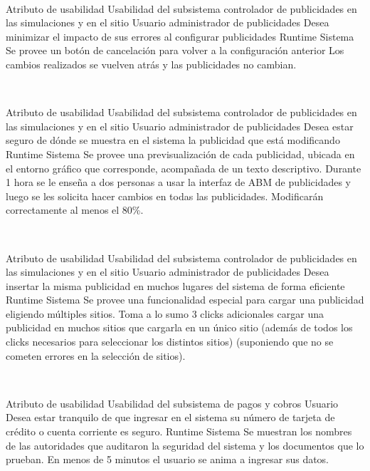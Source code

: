 ~

\escenario
{Atributo de usabilidad}
{Usabilidad del subsistema controlador de publicidades en las simulaciones y en el sitio}
{Usuario administrador de publicidades}
{Desea minimizar el impacto de sus errores al configurar publicidades}
{Runtime}
{Sistema}
{Se provee un botón de cancelación para volver a la configuración anterior}
{Los cambios realizados se vuelven atrás y las publicidades no cambian.}

~

\escenario
{Atributo de usabilidad}
{Usabilidad del subsistema controlador de publicidades en las simulaciones y en el sitio}
{Usuario administrador de publicidades}
{Desea estar seguro de dónde se muestra en el sistema la publicidad que está modificando}
{Runtime}
{Sistema}
{Se provee una previsualización de cada publicidad, ubicada en el entorno gráfico que corresponde, acompañada de un texto descriptivo.}
{Durante 1 hora se le enseña a dos personas a usar la interfaz de ABM de publicidades y luego se les solicita hacer cambios en todas las publicidades. Modificarán correctamente al menos el 80\%.}

~

\escenario
{Atributo de usabilidad}
{Usabilidad del subsistema controlador de publicidades en las simulaciones y en el sitio}
{Usuario administrador de publicidades}
{Desea insertar la misma publicidad en muchos lugares del sistema de forma eficiente}
{Runtime}
{Sistema}
{Se provee una funcionalidad especial para cargar una publicidad eligiendo múltiples sitios.}
{Toma a lo sumo 3 clicks adicionales cargar una publicidad en muchos sitios que cargarla en un único sitio (además de todos los clicks necesarios para seleccionar los distintos sitios) (suponiendo que no se cometen errores en la selección de sitios).}

~

\escenario
{Atributo de usabilidad}
{Usabilidad del subsistema de pagos y cobros}
{Usuario}
{Desea estar tranquilo de que ingresar en el sistema su número de tarjeta de crédito o cuenta corriente es seguro.}
{Runtime}
{Sistema}
{Se muestran los nombres de las autoridades que auditaron la seguridad del sistema y los documentos que lo prueban.}
{En menos de 5 minutos el usuario se anima a ingresar sus datos.	}


